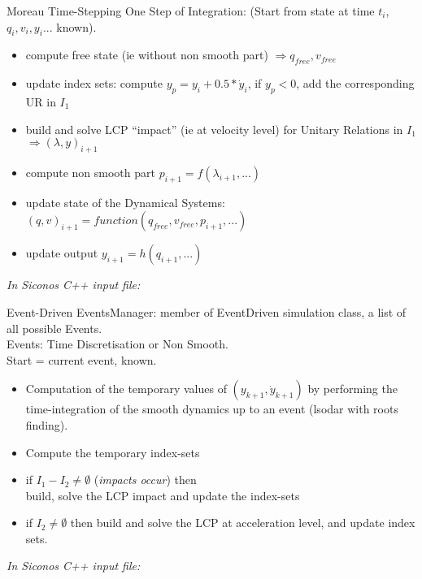 {
\begin{block}{Moreau Time-Stepping}
One Step of Integration: (Start from state at time $t_i$, $q_i, v_i, y_i ...$ known). \\
\begin{itemize}
\item compute free state (ie without non smooth part) $\Rightarrow q_{free}, v_{free}$
\item update index sets: compute $y_p = y_i + 0.5*{\dot y}_i$, if $y_p<0$, add the corresponding UR in $I_1$
\item build and solve LCP ``impact'' (ie at velocity level) for Unitary Relations in $I_1$ $\Rightarrow (\lambda, y)_{i+1}$
\item compute non smooth part $p_{i+1} = f(\lambda_{i+1},...)$
\item update state of the Dynamical Systems: $(q,v)_{i+1}=function(q_{free}, v_{free}, p_{i+1},...) $
\item update output $y_{i+1}= h(q_{i+1}, ...)$
\end{itemize}
\end{block}
\vspace{1cm}
\pause
\it{In Siconos C++ input file:\\[2mm]}
}
\frame
{
\begin{block}{Event-Driven}
EventsManager: member of EventDriven simulation class, a list of all possible Events. \\
Events: Time Discretisation or Non Smooth.\\[3mm]
Start = current event, known. 
\begin{itemize}
\item Computation of the temporary values of $(y_{k+1},{\dot y}_{k+1})$ by performing the time-integration of the smooth dynamics up to an event (lsodar with roots finding).
\item Compute the temporary index-sets 
\item if {$I_1-I_2 \neq \emptyset$} (\textit{impacts occur}) then \\
build, solve the LCP impact and update the index-sets 
\item if {$I_2 \neq \emptyset$} then
build and solve the LCP at acceleration level, and update index sets. \\
\end{itemize}
\end{block}
\pause
\it{In Siconos C++ input file:\\[2mm]}

}
